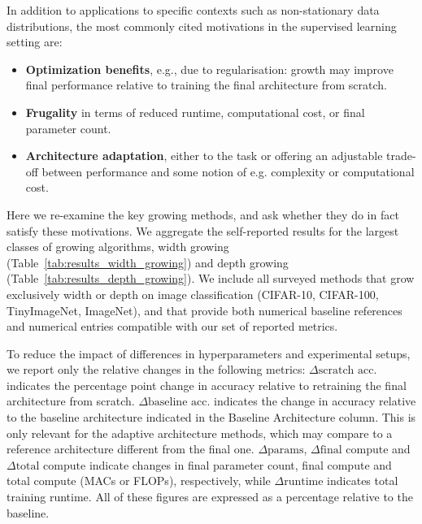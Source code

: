 \makeatother

In addition to applications to specific contexts such as non-stationary data distributions, the most commonly cited motivations in the supervised learning setting are:
\begin{itemize}
    \item \textbf{Optimization benefits}, e.g., due to regularisation: growth may improve final performance relative to training the final architecture from scratch.
    \item \textbf{Frugality} in terms of reduced runtime, computational cost, or final parameter count.
    \item \textbf{Architecture adaptation}, either to the task or offering an adjustable trade-off between performance and some notion of e.g. complexity or computational cost.
\end{itemize}
Here we re-examine the key growing methods, and ask whether they do in fact satisfy these motivations.
We aggregate the self-reported results for the largest classes of growing algorithms, width growing (Table~\ref{tab:results_width_growing}) and depth growing (Table~\ref{tab:results_depth_growing}). We include all surveyed methods that grow exclusively width or depth on image classification (CIFAR-10, CIFAR-100, TinyImageNet, ImageNet), and that provide both numerical baseline references and numerical entries compatible with our set of reported metrics.

To reduce the impact of differences in hyperparameters and experimental setups, we report only the relative changes in the following metrics: $\Delta \textrm{scratch acc.}$ indicates the percentage point change in accuracy relative to retraining the final architecture from scratch. $\Delta \textrm{baseline acc.}$ indicates the change in accuracy relative to the baseline architecture indicated in the Baseline Architecture column. This is only relevant for the adaptive architecture methods, which may compare to a reference architecture different from the final one. $\Delta \textrm{params}$, $\Delta\textrm{final compute}$ and $\Delta\textrm{total compute}$ indicate changes in final parameter count, final compute and total compute (MACs or FLOPs), respectively, while $\Delta\textrm{runtime}$ indicates total training runtime. All of these figures are expressed as a percentage relative to the baseline.

